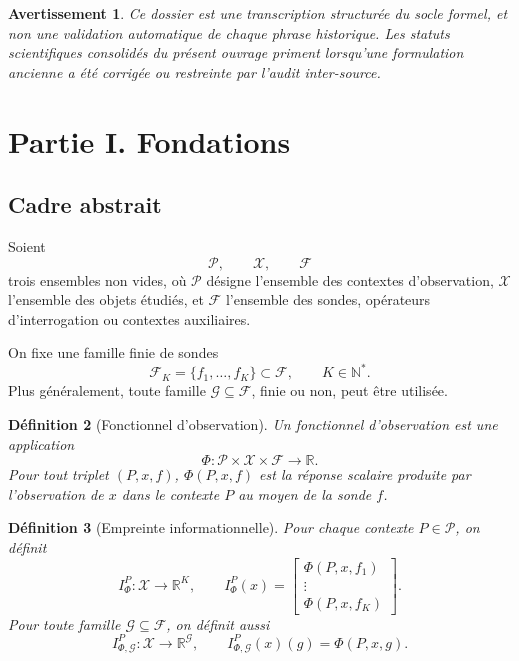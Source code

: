 \documentclass[11pt,a4paper,openany]{book}
\newtheorem{definition}{Définition}[chapter]
\newtheorem{warning}[definition]{Avertissement}
\begin{document}
\begin{warning}
Ce dossier est une transcription structurée du socle formel, et non une validation automatique de chaque phrase historique. Les statuts scientifiques consolidés du présent ouvrage priment lorsqu'une formulation ancienne a été corrigée ou restreinte par l'audit inter-source.
\end{warning}

\section{Partie I. Fondations}

\subsection{Cadre abstrait}

Soient
\[
\mathcal P,\qquad \mathcal X,\qquad \mathcal F
\]
trois ensembles non vides, où \(\mathcal P\) désigne l'ensemble des contextes d'observation, \(\mathcal X\) l'ensemble des objets étudiés, et \(\mathcal F\) l'ensemble des sondes, opérateurs d'interrogation ou contextes auxiliaires.

On fixe une famille finie de sondes
\[
\mathcal F_K=\{f_1,\ldots,f_K\}\subset \mathcal F,
\qquad K\in\mathbb N^*.
\]
Plus généralement, toute famille \(\mathcal G\subseteq\mathcal F\), finie ou non, peut être utilisée.

\begin{definition}[Fonctionnel d'observation]
Un \emph{fonctionnel d'observation} est une application
\[
\Phi:\mathcal P\times\mathcal X\times\mathcal F\longrightarrow \mathbb R.
\]
Pour tout triplet \((P,x,f)\), \(\Phi(P,x,f)\) est la réponse scalaire produite par l'observation de \(x\) dans le contexte \(P\) au moyen de la sonde \(f\).
\end{definition}

\begin{definition}[Empreinte informationnelle]
Pour chaque contexte \(P\in\mathcal P\), on définit
\[
I_\Phi^P:\mathcal X\longrightarrow \mathbb R^K,
\qquad
I_\Phi^P(x)=
\begin{bmatrix}
\Phi(P,x,f_1)\\
\vdots\\
\Phi(P,x,f_K)
\end{bmatrix}.
\]
Pour toute famille \(\mathcal G\subseteq\mathcal F\), on définit aussi
\[
I_{\Phi,\mathcal G}^P:\mathcal X\longrightarrow \mathbb R^{\mathcal G},
\qquad
I_{\Phi,\mathcal G}^P(x)(g)=\Phi(P,x,g).
\]
\end{definition}
\end{document}
